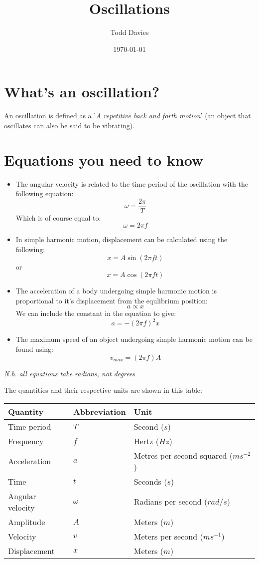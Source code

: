 \documentclass{article}
\title{Oscillations}
\author{Todd Davies}
\date{\today}
\begin{document}
\lhead{\today}

\maketitle

\section*{What's an oscillation?}
\thispagestyle{empty}
An oscillation is defined as a '\textit{A repetitive back and forth motion}'
(an object that oscillates can also be said to be vibrating).

\section*{Equations you need to know}
\begin{itemize}
	\item The angular velocity is related to the time period of the oscillation
	with the following equation:
	\[
		\omega = \frac{2 \pi}{T}
	\]
	Which is of course equal to:
	\[
	 \omega = 2 \pi f
	\]
	\item In simple harmonic motion, displacement can be calculated using the
	following:
	\[
		x = A \sin (2 \pi ft)
	\]
	or
	\[
		x = A \cos(2 \pi ft)
	\]
	\item The acceleration of a body undergoing simple harmonic motion is
	proportional to it's displacement from the equlibrium position:
	\[
		a \propto x
	\]
	We can include the constant in the equation to give:
	\[
		a = -(2 \pi f)^{2}x
	\]
	\item The maximum speed of an object undergoing simple harmonic motion can
	be found using:
	\[
		v_{max} = (2 \pi f)A
	\]
\end{itemize}

\textit{N.b. all equations take radians, not degrees}

The quantities and their respective units are shown in this table:

\begin{center}
	\begin{tabular}{|l|l|l|}
		\hline
			Quantity & Abbreviation & Unit \\ \hline
			Time period & $T$ & Second ($s$) \\ \hline
			Frequency & $f$ & Hertz ($Hz$) \\ \hline
			Acceleration & $a$ & Metres per second squared ($ms^{-2}$) \\ \hline
			Time & $t$ & Seconds ($s$) \\ \hline
			Angular velocity & $\omega$ & Radians per second ($rad/s$) \\ \hline
			Amplitude & $A$ & Meters ($m$) \\ \hline
			Velocity & $v$ & Meters per second ($ms^{-1}$) \\ \hline
			Displacement & $x$ & Meters ($m$) \\ \hline
	\end{tabular}
\end{center}
\end{document}
